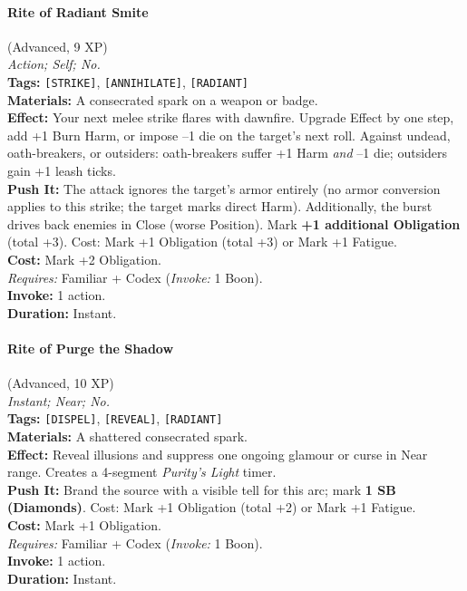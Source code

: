\paragraph{Rite of Radiant Smite} (Advanced, 9 XP) \hfill \\
\emph{Action; Self; No.} \\
\textbf{Tags:} \texttt{[STRIKE]}, \texttt{[ANNIHILATE]}, \texttt{[RADIANT]} \\
\textbf{Materials:} A consecrated spark on a weapon or badge. \\
\textbf{Effect:} Your next melee strike flares with dawnfire. Upgrade Effect by one step, add +1 Burn Harm, or impose --1 die on the target's next roll. Against undead, oath-breakers, or outsiders: oath-breakers suffer +1 Harm \textit{and} --1 die; outsiders gain +1 leash ticks. \\
\textbf{Push It:} The attack ignores the target's armor entirely (no armor conversion applies to this strike; the target marks direct Harm). Additionally, the burst drives back enemies in Close (worse Position). Mark \textbf{+1 additional Obligation} (total +3). Cost: Mark +1 Obligation (total +3) or Mark +1 Fatigue. \\
\textbf{Cost:} Mark +2 Obligation. \\
\textit{Requires:} Familiar + Codex (\textit{Invoke:} 1 Boon). \\
\textbf{Invoke:} 1 action. \\
\textbf{Duration:} Instant.

\paragraph{Rite of Purge the Shadow} (Advanced, 10 XP) \hfill \\
\emph{Instant; Near; No.} \\
\textbf{Tags:} \texttt{[DISPEL]}, \texttt{[REVEAL]}, \texttt{[RADIANT]} \\
\textbf{Materials:} A shattered consecrated spark. \\
\textbf{Effect:} Reveal illusions and suppress one ongoing glamour or curse in Near range. Creates a 4-segment \textit{Purity's Light} timer. \\
\textbf{Push It:} Brand the source with a visible tell for this arc; mark \textbf{1 SB (Diamonds)}. Cost: Mark +1 Obligation (total +2) or Mark +1 Fatigue. \\
\textbf{Cost:} Mark +1 Obligation. \\
\textit{Requires:} Familiar + Codex (\textit{Invoke:} 1 Boon). \\
\textbf{Invoke:} 1 action. \\
\textbf{Duration:} Instant.

